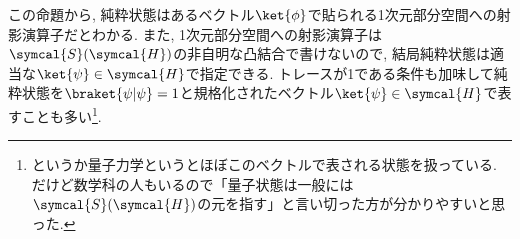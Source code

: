 この命題から, 純粋状態はあるベクトル$\ket{\phi}$で貼られる1次元部分空間への射影演算子だとわかる. 
また, 1次元部分空間への射影演算子は$\symcal{S}(\symcal{H})$の非自明な凸結合で書けないので, 結局純粋状態は適当な$\ket{\psi}\in\symcal{H}$で指定できる. 
トレースが1である条件も加味して純粋状態を$\braket{\psi|\psi}=1$と規格化されたベクトル$\ket{\psi}\in\symcal{H}$で表すことも多い\footnote{というか量子力学というとほぼこのベクトルで表される状態を扱っている. だけど数学科の人もいるので「量子状態は一般には$\symcal{S}(\symcal{H})$の元を指す」と言い切った方が分かりやすいと思った. }. 




